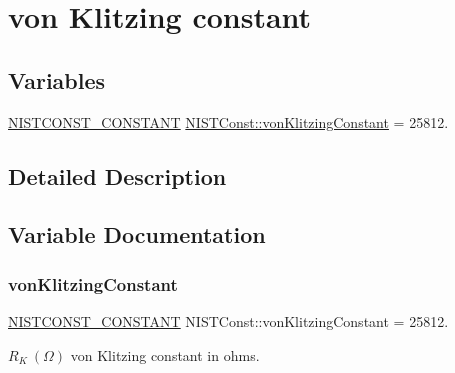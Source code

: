 \hypertarget{group___n_i_s_t_const-von_klitzing_constant}{}\section{von Klitzing constant}
\label{group___n_i_s_t_const-von_klitzing_constant}
\subsection*{Variables}
\begin{DoxyCompactItemize}
\item 
\mbox{\hyperlink{_n_i_s_t_const_8hpp_a2b0fc1d7452373f816175dd86ce26729}{N\+I\+S\+T\+C\+O\+N\+S\+T\+\_\+\+C\+O\+N\+S\+T\+A\+NT}} \mbox{\hyperlink{group___n_i_s_t_const-von_klitzing_constant_ga1807b35d7b414619c32937c946fe16ed}{N\+I\+S\+T\+Const\+::von\+Klitzing\+Constant}} = 25812.
\end{DoxyCompactItemize}


\subsection{Detailed Description}


\subsection{Variable Documentation}
\mbox{\label{group___n_i_s_t_const-von_klitzing_constant_ga1807b35d7b414619c32937c946fe16ed}} 
\subsubsection{\texorpdfstring{von\+Klitzing\+Constant}{vonKlitzingConstant}}
{\footnotesize\ttfamily \mbox{\hyperlink{_n_i_s_t_const_8hpp_a2b0fc1d7452373f816175dd86ce26729}{N\+I\+S\+T\+C\+O\+N\+S\+T\+\_\+\+C\+O\+N\+S\+T\+A\+NT}} N\+I\+S\+T\+Const\+::von\+Klitzing\+Constant = 25812.}

$R_K \ (\Omega)$ von Klitzing constant in ohms. 